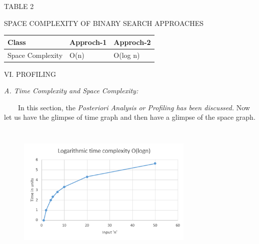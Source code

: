 \documentclass[12pt,a4paper]{article}
\begin{document}
\begin{center}TABLE 2\end{center}

\begin{center}SPACE COMPLEXITY OF  BINARY SEARCH APPROACHES\end{center}

\begin{table}[h]
\centering
\begin{tabular}{|l|l|l|}
\hline
\textbf{Class} & \textbf{Approch-1} & \textbf{Approch-2} \\
\hline
Space Complexity & O(n) & O(log n) \\
\hline
\end{tabular}
\end{table}

\begin{multicols}{2}


\begin{center}VI. PROFILING\end{center}



\textit{A. Time Complexity and Space Complexity:}

\ \ \ \ In this section, the  \textit{Posteriori Analysis or Profiling has been discussed. }
Now let us have the glimpse of time graph and then have a glimpse of the space graph.
\end{multicols}
\begin{figure}[h]
\centering
\includegraphics[width=8.44cm,height=6.64cm]{logarithmic-time-complexity.png}
\end{figure}
\end{document}
